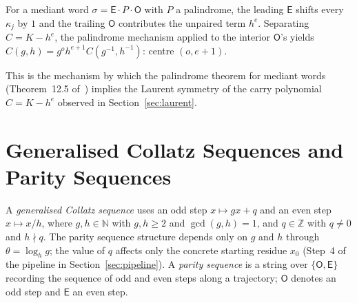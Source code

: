 \documentclass[12pt]{article}
\theoremstyle{definition}
\theoremstyle{remark}
\theoremstyle{plain}
\newcommand{\ZZ}{\mathbb{Z}}
\newcommand{\NN}{\mathbb{N}}
\newcommand{\OO}{\mathsf{O}}
\newcommand{\EE}{\mathsf{E}}
\begin{document}
For a mediant word $\sigma = \EE \cdot P \cdot \OO$ with $P$ a palindrome, the
leading $\EE$ shifts every $\kappa_j$ by $1$ and the trailing $\OO$ contributes
the unpaired term $h^e$.  Separating $C = K - h^e$, the palindrome mechanism
applied to the interior $\OO$'s yields
$C(g,h) = g^o h^{e+1} C(g^{-1}, h^{-1})$: centre $(o, e+1)$.

This is the mechanism by which the palindrome theorem for mediant words
(Theorem~12.5 of~\cite{paper76}) implies the Laurent symmetry of the carry
polynomial $C = K - h^e$ observed in Section~\ref{sec:laurent}.

\section{Generalised Collatz Sequences and Parity Sequences}
\label{sec:collatz}

A \emph{generalised Collatz sequence} uses an odd step $x \mapsto gx + q$ and an
even step $x \mapsto x/h$, where $g, h \in \NN$ with $g, h \geq 2$ and
$\gcd(g, h) = 1$, and $q \in \ZZ$ with $q \neq 0$ and $h \nmid q$.
The parity sequence structure depends only on $g$ and $h$ through
$\theta = \log_h g$; the value of $q$ affects only the concrete starting
residue $x_0$ (Step~4 of the pipeline in Section~\ref{sec:pipeline}).
A \emph{parity sequence} is a string over $\{\OO, \EE\}$ recording the sequence
of odd and even steps along a trajectory; $\OO$ denotes an odd step and $\EE$ an
even step.
\end{document}
